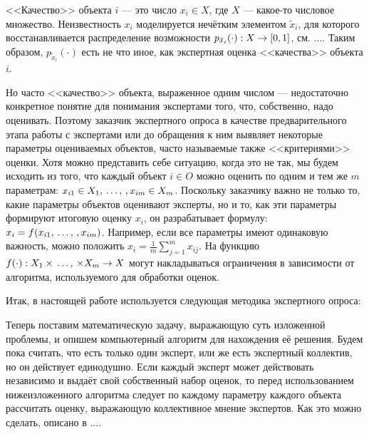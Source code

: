 <<Качество>> объекта $i$ --- это число $x_i \in X$, где $X$ --- какое-то числовое множество. Неизвестность $x_i$ моделируется нечётким элементом $\tilde x_i$, для которого восстанавливается  распределение возможности $p_{\tilde x_i}(\cdot): X \rightarrow [0,1]$, см. .... Таким образом, $p_{\tilde x_i}(\cdot)$ есть не что иное, как экспертная оценка <<качества>> объекта $i$.    

Но часто <<качество>> объекта, выраженное одним числом --- недостаточно конкретное понятие для понимания экспертами того, что, собственно, надо оценивать. Поэтому заказчик экспертного опроса в качестве предварительного этапа работы с экспертами или до обращения к ним выявляет некоторые параметры оцениваемых объектов, часто называемые также <<критериями>> оценки. Хотя можно представить себе ситуацию, когда это не так, мы будем исходить из того, что каждый объект $i \in O$ можно оценить по одним и тем же $m$ параметрам: $x_{i1} \in X_1, \, \ldots,\,, x_{im} \in X_m$.  Поскольку заказчику важно не только то, какие параметры объектов оценивают эксперты, но и то, как эти параметры формируют итоговую оценку $x_i$, он разрабатывает формулу: $x_i = f(x_{i1}, \, \ldots,\,, x_{im})$. Например, если все параметры имеют одинаковую важность, можно положить $x_i = \frac{1}{m}\sum_{j=1}^m{x_{ij}}$. На функцию $f(\cdot): X_1 \times \, \ldots,\, \times X_m \rightarrow X$ могут накладываться ограничения в зависимости от алгоритма, используемого для обработки оценок. 


Итак, в настоящей работе используется следующая методика экспертного опроса:
\begin{center}  \end{center}

Теперь поставим математическую задачу, выражающую суть изложенной проблемы, и опишем компьютерный алгоритм для нахождения её решения. Будем пока считать, что есть только один эксперт, или же есть экспертный коллектив, но он действует единодушно. Если каждый эксперт может действовать независимо и выдаёт свой собственный набор оценок, то перед использованием нижеизложенного алгоритма следует по каждому параметру каждого объекта рассчитать оценку, выражающую коллективное мнение экспертов. Как это можно сделать, описано в ....

